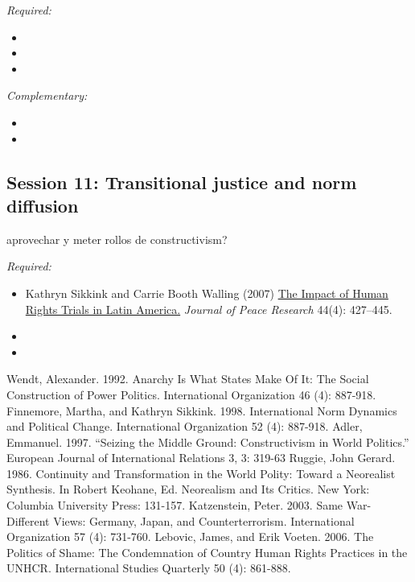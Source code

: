 \documentclass[12pt, a4paper]{article}
\begin{document}
\noindent\textit{Required:}

\begin{itemize}
  \item
  \item
  \item
\end{itemize}

\noindent\textit{Complementary:}

\begin{itemize}
  \item
  \item
\end{itemize}

\vspace{20pt}
\hline
\subsection*{Session 11: Transitional justice and norm diffusion}

aprovechar y meter rollos de constructivism?

\noindent\textit{Required:}

\begin{itemize}
  \item Kathryn Sikkink and Carrie Booth Walling (2007) \href{https://doi.org/10.1177/002234330707895}{The Impact of Human Rights Trials in Latin America.} \textit{Journal of Peace Research} 44(4): 427--445.
  \item {\color{red}{Kim HJ. 2012. Structural determinants of human rights prosecutions after democratic transition. J. Peace Res. 49(2):305–20}}
  \item {\color{red}{Kim HJ, Sikkink K. 2010. Explaining the deterrence effect of human rights prosecutions for transitional countries. Int. Stud. Q. 54:939–63}}
\end{itemize}

Wendt, Alexander. 1992. Anarchy Is What States Make Of It: The Social Construction of Power
Politics. International Organization 46 (4): 887-918.
Finnemore, Martha, and Kathryn Sikkink. 1998. International Norm Dynamics and Political
Change. International Organization 52 (4): 887-918.
Adler, Emmanuel. 1997. “Seizing the Middle Ground: Constructivism in World Politics.”
European Journal of International Relations 3, 3: 319-63
Ruggie, John Gerard. 1986. Continuity and Transformation in the World Polity: Toward a
Neorealist Synthesis. In Robert Keohane, Ed. Neorealism and Its Critics. New York: Columbia University Press: 131-157.
Katzenstein, Peter. 2003. Same War-Different Views: Germany, Japan, and Counterterrorism.
International Organization 57 (4): 731-760.
Lebovic, James, and Erik Voeten. 2006. The Politics of Shame: The Condemnation of Country
Human Rights Practices in the UNHCR. International Studies Quarterly 50 (4): 861-888.
\end{document}
